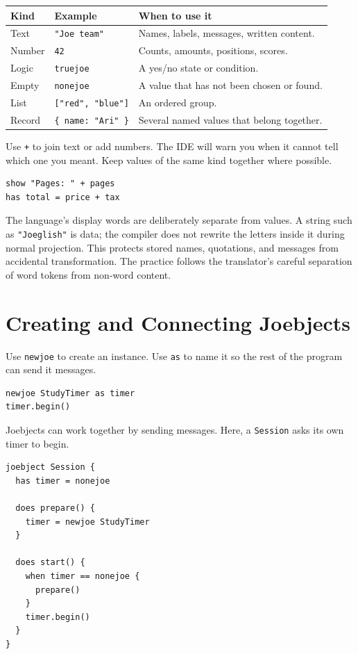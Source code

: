 \documentclass[12pt]{article}
\newcommand{\kw}[1]{\texttt{#1}}
\begin{document}
\begin{longtable}{p{}p{}p{}}
\toprule
\textbf{Kind} & \textbf{Example} & \textbf{When to use it}\\
\midrule
Text & \kw{"Joe team"} & Names, labels, messages, written content.\\
Number & \kw{42} & Counts, amounts, positions, scores.\\
Logic & \kw{truejoe} & A yes/no state or condition.\\
Empty & \kw{nonejoe} & A value that has not been chosen or found.\\
List & \kw{["red", "blue"]} & An ordered group.\\
Record & \kw{\{ name: "Ari" \}} & Several named values that belong together.\\
\bottomrule
\end{longtable}

Use \kw{+} to join text or add numbers. The IDE will warn you when it cannot tell which one you meant. Keep values of the same kind together where possible.

\begin{lstlisting}[style=joe]
show "Pages: " + pages
has total = price + tax
\end{lstlisting}

The language's display words are deliberately separate from values. A string such as \kw{"Joeglish"} is data; the compiler does not rewrite the letters inside it during normal projection. This protects stored names, quotations, and messages from accidental transformation. The practice follows the translator's careful separation of word tokens from non-word content.\cite{translatorEngine}

\clearpage
\section{Creating and Connecting Joebjects}
Use \kw{newjoe} to create an instance. Use \kw{as} to name it so the rest of the program can send it messages.

\begin{lstlisting}[style=joe]
newjoe StudyTimer as timer
timer.begin()
\end{lstlisting}

Joebjects can work together by sending messages. Here, a \kw{Session} asks its own timer to begin.

\begin{lstlisting}[style=joe]
joebject Session {
  has timer = nonejoe

  does prepare() {
    timer = newjoe StudyTimer
  }

  does start() {
    when timer == nonejoe {
      prepare()
    }
    timer.begin()
  }
}
\end{lstlisting}
\end{document}
